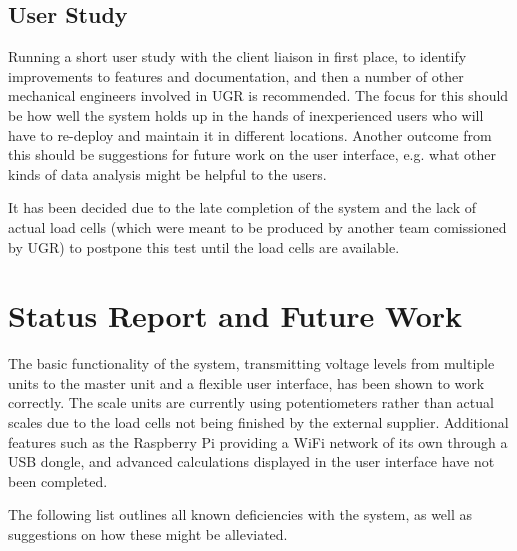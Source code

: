 \subsection{User Study}
Running a short user study with the client liaison in first place, to identify improvements to features and documentation, and then a number of other mechanical engineers involved in UGR is recommended. The focus for this should be how well the system holds up in the hands of inexperienced users who will have to re-deploy and maintain it in different locations. Another outcome from this should be suggestions for future work on the user interface, e.g. what other kinds of data analysis might be helpful to the users.

It has been decided due to the late completion of the system and the lack of actual load cells (which were meant to be produced by another team comissioned by UGR) to postpone this test until the load cells are available.

\section{Status Report and Future Work}
The basic functionality of the system, transmitting voltage levels from multiple units to the master unit and a flexible user interface, has been shown to work correctly. The scale units are currently using potentiometers rather than actual scales due to the load cells not being finished by the external supplier. Additional features such as the Raspberry Pi providing a WiFi network of its own through a USB dongle, and advanced calculations displayed in the user interface have not been completed.

The following list outlines all known deficiencies with the system, as well as suggestions on how these might be alleviated.

